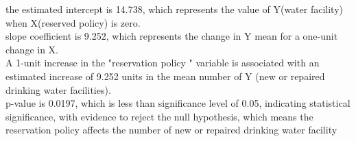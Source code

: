 \documentclass[12pt,letterpaper]{article}
\begin{document}
\begin{enumerate}
 the estimated intercept is 14.738, which represents the value of Y(water facility) when X(reserved policy) is zero.\\
slope coefficient is 9.252, which represents the change in Y mean for a one-unit change in X.\\
A 1-unit increase in the "reservation policy " variable is associated with an estimated increase of 9.252 units in the mean number of Y (new or repaired drinking water facilities).\\
p-value is 0.0197, which is less than significance level of 0.05, indicating statistical significance, with evidence to reject the null hypothesis, which means the reservation policy affects the number of new or repaired drinking water facility  

\end{enumerate}
\end{document}
